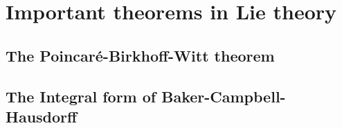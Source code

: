 
\chapter{Important theorems in Lie theory}

\section{The Poincar\'e-Birkhoff-Witt theorem}
\label{sec:AppA_PBW}

\section{The Integral form of Baker-Campbell-Hausdorff}
\label{sec:AppA_BCH}
